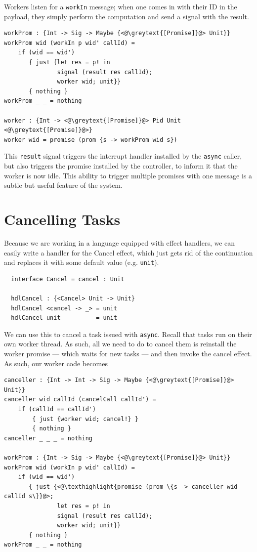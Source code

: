 \documentclass[msc,deptreport,cs]{infthesis} %
\newcommand{\code}[1]{\lstinline{#1}}
\newcommand{\texthighlight}[1]{%
  \colorbox{red!20}{#1}}
\newcommand{\greytext}[1]{\textcolor{black!40}{#1}}
\begin{document}
Workers listen for a \code{workIn} message; when one comes in with their ID in
the payload, they simply perform the computation and send a signal with the
result.

\begin{lstlisting}
workProm : {Int -> Sig -> Maybe {<@\greytext{[Promise]}@> Unit}}
workProm wid (workIn p wid' callId) =
    if (wid == wid')
       { just {let res = p! in
               signal (result res callId);
               worker wid; unit}}
       { nothing }
workProm _ _ = nothing

worker : {Int -> <@\greytext{[Promise]}@> Pid Unit <@\greytext{[Promise]}@>}
worker wid = promise (prom {s -> workProm wid s})
\end{lstlisting}

This \code{result} signal triggers the interrupt handler installed by the
\code{async} caller, but also triggers the promise installed by the controller,
to inform it that the worker is now idle. This ability to trigger multiple
promises with one message is a subtle but useful feature of the system.


\section{Cancelling Tasks}

Because we are working in a language equipped with effect handlers, we can
easily write a handler for the \textsf{Cancel} effect, which just gets rid of
the continuation and replaces it with some default value (e.g. \code{unit}).

\begin{lstlisting}
  interface Cancel = cancel : Unit
 
  hdlCancel : {<Cancel> Unit -> Unit}
  hdlCancel <cancel -> _> = unit
  hdlCancel unit          = unit
\end{lstlisting}


We can use this to cancel a task issued with \code{async}. Recall that tasks run
on their own worker thread. As such, all we need to do to cancel them is
reinstall the worker promise --- which waits for new tasks --- and then invoke
the cancel effect. As such, our worker code becomes

\begin{lstlisting}
canceller : {Int -> Int -> Sig -> Maybe {<@\greytext{[Promise]}@> Unit}}
canceller wid callId (cancelCall callId') =
    if (callId == callId')
        { just {worker wid; cancel!} }
        { nothing }
canceller _ _ _ = nothing

workProm : {Int -> Sig -> Maybe {<@\greytext{[Promise]}@> Unit}}
workProm wid (workIn p wid' callId) =
    if (wid == wid')
       { just {<@\texthighlight{promise (prom \{s -> canceller wid callId s\}}@>;
               let res = p! in
               signal (result res callId);
               worker wid; unit}}
       { nothing }
workProm _ _ = nothing
\end{lstlisting}
\end{document}
